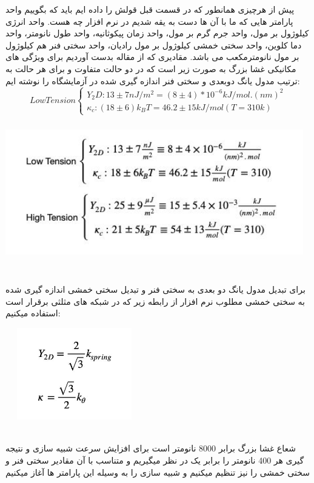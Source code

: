 \documentclass[12pt,onecolumn,a4paper]{report}
\begin{document}
پیش از هرچیزی همانطور که در قسمت قبل قولش را داده ایم باید که بگوییم واحد پارامتر هایی که ما با آن ها دست به یقه شدیم در نرم افزار چه هست.  واحد انرژی کیلوژول بر مول، واحد جرم گرم بر مول، واحد زمان پیکوثانیه، واحد طول نانومتر، واحد دما کلوین، واحد سختی خمشی کیلوژول بر مول رادیان، واحد سختی فنر هم کیلوژول بر مول نانومترمکعب می باشد.
مقادیری  که از مقاله بدست آوردیم برای ویژگی های مکانیکی غشا بزرگ به صورت زیر است که در دو حالت متفاوت و برای هر حالت به ترتیب مدول یانگ دوبعدی و سختی فنر اندازه گیری شده در آزمایشگاه را نوشته ایم:\\ 
\[ Low Tension 
  \begin{cases}
    Y_2D : 13 \pm 7 nJ/m^2 = (8 \pm 4) * 10^{-6} kJ/mol.(nm)^2\\
    \kappa_c : (18 \pm 6)k_{B}T = 46.2 \pm 15 kJ/mol    (T=310k)
  \end{cases}
\]
\begin{center}
\includegraphics[width=13cm, height=6cm]{IMG_20210215_210004_891.jpg}
\end{center}\\
برای تبدیل مدول یانگ دو بعدی به سختی فنر و تبدیل سختی خمشی اندازه گیری شده به سختی خمشی مطلوب نرم افزار از رابطه  زیر که در شبکه های مثلثی برقرار است استفاده میکنیم:
\begin{center}
\includegraphics[width=6cm, height=4cm]{IMG_20210215_210007_241 (1).jpg}
\end{center}\\
شعاع غشا بزرگ برابر 8000 نانومتر است برای افزایش سرعت شبیه سازی و نتیجه گیری هر 400 نانومتر را برابر یک در نظر میگیریم و متناسب با آن مقادیر سختی فنر و سختی خمشی را نیز تنظیم میکنیم و شبیه سازی را به وسیله این پارامتر ها آغاز میکنیم
\end{document}
